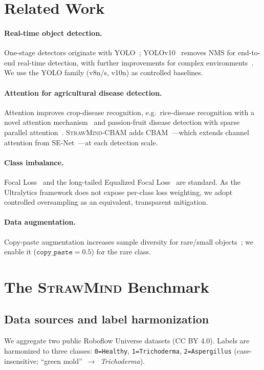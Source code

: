 \documentclass[11pt]{article}
\newcommand{\sm}{\textsc{StrawMind}}
\newcommand{\smc}{\textsc{StrawMind-CBAM}}
\begin{document}
\section{Related Work}
\paragraph{Real-time object detection.} One-stage detectors originate with YOLO~\cite{redmon2016yolo};
YOLOv10~\cite{wang2024yolov10} removes NMS for end-to-end real-time detection, with further
improvements for complex environments~\cite{wu2025improvedyolov10}. We use the YOLO family
(v8n/s, v10n) as controlled baselines.
\paragraph{Attention for agricultural disease detection.} Attention improves crop-disease recognition,
e.g.\ rice-disease recognition with a novel attention mechanism~\cite{chen2023domainrice} and
passion-fruit disease detection with sparse parallel attention~\cite{he2025passionfruit}. \smc{}
adds CBAM~\cite{woo2018cbam}---which extends channel attention from SE-Net~\cite{hu2018senet}---at each detection scale.
\paragraph{Class imbalance.} Focal Loss~\cite{lin2017focal} and the long-tailed Equalized Focal
Loss~\cite{li2022equalized} are standard. As the Ultralytics framework does not expose per-class
loss weighting, we adopt controlled oversampling as an equivalent, transparent mitigation.
\paragraph{Data augmentation.} Copy-paste augmentation increases sample diversity for rare/small
objects~\cite{zhang2023copypaste}; we enable it ($\texttt{copy\_paste}=0.5$) for the rare class.

\section{The \sm{} Benchmark}
\subsection{Data sources and label harmonization}
We aggregate two public Roboflow Universe datasets (CC BY 4.0). Labels are harmonized to three
classes: \texttt{0=Healthy}, \texttt{1=Trichoderma}, \texttt{2=Aspergillus} (case-insensitive;
``green mold''~$\rightarrow$~\emph{Trichoderma}).
\end{document}
